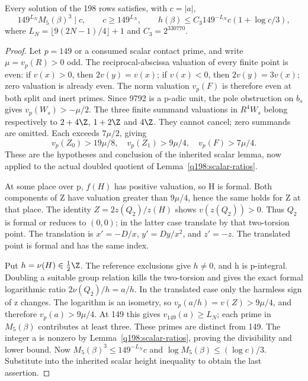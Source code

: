 \begin{lemma}\label{q198:scalar-extraction}
Every solution of the 198 rows satisfies, with $c=|a|$,
\[
 149^{L_N}M_5(\beta)^3\mid c,\qquad
 c\ge149^{L_N},\qquad
 h(\beta)\le C_3 149^{-L_N}c(1+\log c/3),
\]
where $L_N=\lfloor9(2N-1)/4\rfloor+1$ and $C_3=2^{330770}$.
\end{lemma}
\begin{proof}
Let $p=149$ or a consumed scalar contact prime, and write
$\mu=v_p(R)>0$ odd. The reciprocal-abscissa valuation of every
finite point is even: if $v(x)>0$, then $2v(y)=v(x)$; if
$v(x)<0$, then $2v(y)=3v(x)$; zero valuation is already even.
The norm valuation $v_p(F)$ is therefore even at both split and
inert primes. Since 9792 is a p-adic unit, the pole obstruction
on $b_s$ gives $v_p(W_s)>-\mu/2$. The three finite summand
valuations in $R^4W_s$ belong respectively to
$2+4\Z$, $1+2\Z$ and $4\Z$. They cannot cancel; zero summands
are omitted. Each exceeds $7\mu/2$, giving
\[
 v_p(Z_0)>19\mu/8,\quad v_p(Z_1)>9\mu/4,\quad v_p(F)>7\mu/4.
\]
These are the hypotheses and conclusion of the inherited scalar
lemma, now applied to the actual doubled quotient of
Lemma~\ref{q198:scalar-ratios}.

At some place over p, $f(H)$ has positive valuation, so H is formal.
Both components of Z have valuation greater than $9\mu/4$, hence
the same holds for Z at that place. The identity
$Z=2z(Q_2)/z(H)$ shows $v(z(Q_2))>0$.
Thus $Q_2$ is formal or reduces to $(0,0)$; in the latter case
translate by that two-torsion point. The translation is
$x'=-D/x$, $y'=Dy/x^2$, and $z'=-z$.
The translated point is formal and has the same index.

Put $h=\nu(H)\in\tfrac12\Z$. The reference exclusions give
$h\ne0$, and h is p-integral. Doubling a suitable group relation
kills the two-torsion and gives the exact formal logarithmic ratio
$2\nu(Q_2)/h=a/h$. In the translated case only the harmless
sign of z changes. The logarithm is an isometry, so
$v_p(a/h)=v(Z)>9\mu/4$, and therefore
$v_p(a)>9\mu/4$. At 149 this gives $v_{149}(a)\ge L_N$;
each prime in $M_5(\beta)$ contributes at least three. These primes
are distinct from 149. The integer a is nonzero by
Lemma~\ref{q198:scalar-ratios}, proving the divisibility and lower bound.
Now $M_5(\beta)^3\le149^{-L_N}c$ and
$\log M_5(\beta)\le(\log c)/3$. Substitute into the inherited
scalar height inequality to obtain the last assertion.
\end{proof}

